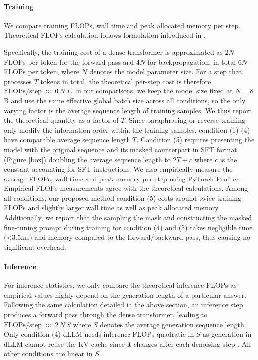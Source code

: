 \paragraph{Training} We compare training FLOPs, wall time and peak allocated memory per step. Theoretical FLOPs calculation follows formulation introduced in \cite{kaplan2020scalinglawsneurallanguage}.  

Specifically, the training cost of a dense transformer is approximated as \(2N\) FLOPs per token for the forward pass and \(4N\) for backpropagation, in total \(6N\) FLOPs per token, where $N$ denotes the model parameter size. For a step that processes \(T\) tokens in total, the theoretical per-step cost is therefore $\mathrm{FLOPs/step}\;\approx\;6\,N\,T$.
In our comparisons, we keep the model size fixed at \(N{=}8\)B and use the same effective global batch size across all conditions, so the only varying factor is the average sequence length of training samples. We thus report the theoretical quantity as a factor of $T$. Since paraphrasing or reverse training only modify the information order within the training samples, condition (1)-(4) have comparable average sequence length $T$. Condition (5) requires presenting the model with the original sequence and its masked counterpart in SFT format (Figure \ref{box}) doubling the average sequence length to $2T+c$ where $c$ is the constant accounting for SFT instructions. We also empirically measure the average FLOPs, wall time and peak memory per step using PyTorch Profiler. Empirical FLOPs measurements agree with the theoretical calculations. Among all conditions, our proposed method condition (5) costs around twice training FLOPs and slightly larger wall time as well as peak allocated memory. Additionally, we report that the sampling the mask and constructing the masked fine-tuning prompt during training for condition (4) and (5) takes negligible time (<3.5ms) and memory compared to the forward/backward pass, thus causing no significant overhead.  

\paragraph{Inference} For inference statistics, we only compare the theoretical inference FLOPs as empirical values highly depend on the generation length of a particular answer. Following the same calculation detailed in the above section, an inference step produces a forward pass through the dense transformer, leading to $\mathrm{FLOPs/step}\;\approx\;2\,N\,S$ where $S$ denotes the average generation sequence length. Only condition (4) dLLM needs inference FLOPs quadratic in $S$ as generation in dLLM cannot reuse the KV cache since it changes after each denoising step \citep{ni2025difflm}. All other conditions are linear in $S$.

